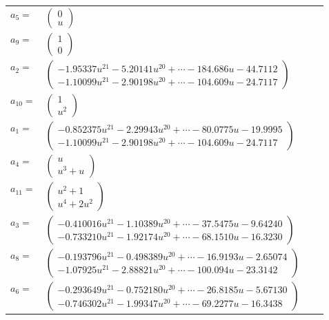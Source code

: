 \documentclass[1p]{elsarticle_modified}
\theoremstyle{definition}
\begin{document}
\begin{tabular}{m{7pt} m{180pt} m{7pt} m{180pt} }
\flushright $a_{5}=$&$\begin{pmatrix}0\\u\end{pmatrix}$ \\
\flushright $a_{9}=$&$\begin{pmatrix}1\\0\end{pmatrix}$ \\
\flushright $a_{2}=$&$\begin{pmatrix}-1.95337 u^{21}-5.20141 u^{20}+\cdots-184.686 u-44.7112\\-1.10099 u^{21}-2.90198 u^{20}+\cdots-104.609 u-24.7117\end{pmatrix}$ \\
\flushright $a_{10}=$&$\begin{pmatrix}1\\u^2\end{pmatrix}$ \\
\flushright $a_{1}=$&$\begin{pmatrix}-0.852375 u^{21}-2.29943 u^{20}+\cdots-80.0775 u-19.9995\\-1.10099 u^{21}-2.90198 u^{20}+\cdots-104.609 u-24.7117\end{pmatrix}$ \\
\flushright $a_{4}=$&$\begin{pmatrix}u\\u^3+u\end{pmatrix}$ \\
\flushright $a_{11}=$&$\begin{pmatrix}u^2+1\\u^4+2 u^2\end{pmatrix}$ \\
\flushright $a_{3}=$&$\begin{pmatrix}-0.410016 u^{21}-1.10389 u^{20}+\cdots-37.5475 u-9.64240\\-0.733210 u^{21}-1.92174 u^{20}+\cdots-68.1510 u-16.3230\end{pmatrix}$ \\
\flushright $a_{8}=$&$\begin{pmatrix}-0.193796 u^{21}-0.498389 u^{20}+\cdots-16.9193 u-2.65074\\-1.07925 u^{21}-2.88821 u^{20}+\cdots-100.094 u-23.3142\end{pmatrix}$ \\
\flushright $a_{6}=$&$\begin{pmatrix}-0.293649 u^{21}-0.752180 u^{20}+\cdots-26.8185 u-5.67130\\-0.746302 u^{21}-1.99347 u^{20}+\cdots-69.2277 u-16.3438\end{pmatrix}$ \\

\end{tabular}
\end{document}
